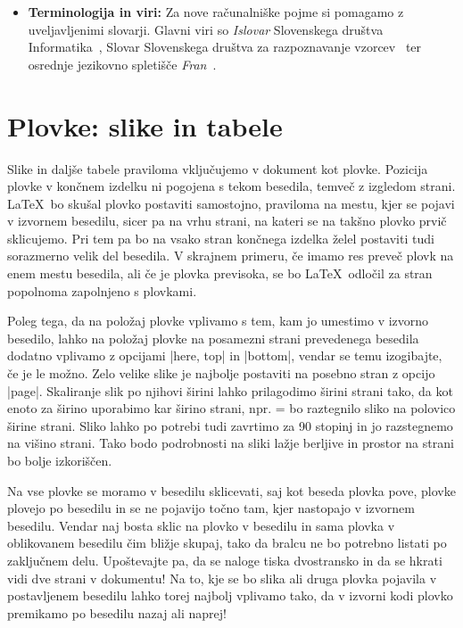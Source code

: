 \documentclass[9pt]{style/friteza}
\begin{document}
\begin{itemize}
    \item \textbf{Terminologija in viri:} Za nove računalniške pojme si pomagamo z uveljavljenimi slovarji. Glavni viri so \textit{Islovar} Slovenskega društva Informatika~\cite{Islovar}, Slovar Slovenskega društva za razpoznavanje vzorcev~\cite{sdrv} ter osrednje jezikovno spletišče \textit{Fran}~\cite{fran}.
\end{itemize}

\section{Plovke: slike in tabele}
\label{sec:plovke}

Slike in daljše tabele praviloma vključujemo v dokument kot plovke.
Pozicija plovke v končnem izdelku ni pogojena s tekom besedila, temveč z izgledom strani.
\LaTeX\ bo skušal plovko postaviti samostojno, praviloma na mestu, kjer se pojavi v izvornem besedilu, sicer pa na
vrhu strani, na kateri se na takšno plovko prvič sklicujemo.
Pri tem pa bo na vsako stran končnega izdelka želel postaviti tudi sorazmerno velik del besedila.
V skrajnem primeru, če imamo res preveč plovk na enem mestu besedila, ali če je plovka previsoka, se bo \LaTeX\ odločil za stran popolnoma zapolnjeno s plovkami.

Poleg tega, da na položaj plovke vplivamo s tem, kam jo umestimo v izvorno besedilo, lahko na položaj plovke na posamezni strani prevedenega besedila dodatno vplivamo z opcijami \ltx|here, top| in \ltx|bottom|, vendar se temu izogibajte, če je le možno. 
Zelo velike slike je najbolje postaviti na posebno stran z opcijo \ltx|page|.
Skaliranje slik po njihovi širini lahko prilagodimo širini strani tako, da kot enoto za širino uporabimo kar širino strani, npr. \textwidth= bo raztegnilo sliko na polovico širine strani.
Sliko lahko po potrebi tudi zavrtimo za 90 stopinj in jo razstegnemo na višino strani.
Tako bodo podrobnosti na sliki lažje berljive in prostor na strani bo bolje izkoriščen.

Na vse plovke se moramo v besedilu sklicevati, saj kot beseda plovka pove, plovke plovejo po besedilu in se ne pojavijo točno tam, kjer nastopajo v izvornem besedilu.
Vendar naj bosta  sklic na plovko v besedilu in sama plovka v oblikovanem besedilu čim bližje skupaj, tako da bralcu ne bo potrebno listati po zaključnem delu.
Upoštevajte pa, da se naloge tiska dvostransko in da se hkrati vidi dve strani v dokumentu!
Na to, kje se bo slika ali druga plovka pojavila v postavljenem besedilu lahko torej najbolj vplivamo tako, da v izvorni kodi plovko premikamo po besedilu nazaj ali naprej!
\end{document}
